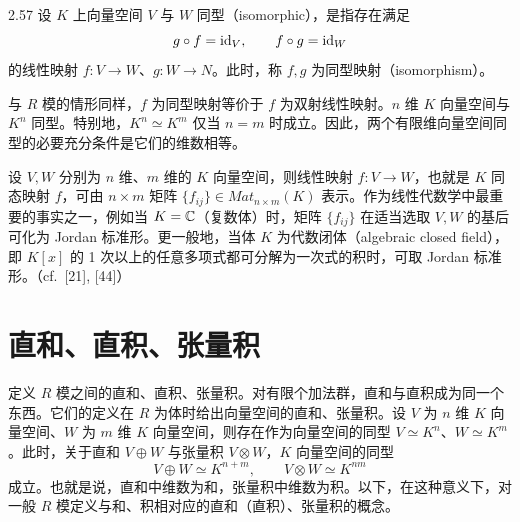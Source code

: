 \begin{definition}{2.57} 设 $K$ 上向量空间 $V$ 与 $W$ 同型（isomorphic），是指存在满足
\[
  g\circ f=\mathrm{id}_V,\qquad f\circ g=\mathrm{id}_W
\]
的线性映射 $f\colon V\to W$、$g\colon W\to N$。此时，称 $f,g$ 为同型映射（isomorphism）。\end{definition}


与 $R$ 模的情形同样，$f$ 为同型映射等价于 $f$ 为双射线性映射。$n$ 维 $K$ 向量空间与 $K^n$ 同型。特别地，$K^n\simeq K^m$ 仅当 $n=m$ 时成立。因此，两个有限维向量空间同型的必要充分条件是它们的维数相等。

设 $V,W$ 分别为 $n$ 维、$m$ 维的 $K$ 向量空间，则线性映射 $f\colon V\to W$，也就是 $K$ 同态映射 $f$，可由 $n\times m$ 矩阵 $\{f_{ij}\}\in\mathit{Mat}_{n\times m}(K)$ 表示。作为线性代数学中最重要的事实之一，例如当 $K=\mathbb{C}$（复数体）时，矩阵 $\{f_{ij}\}$ 在适当选取 $V,W$ 的基后可化为 Jordan 标准形。更一般地，当体 $K$ 为代数闭体（algebraic closed field），即 $K[x]$ 的 1 次以上的任意多项式都可分解为一次式的积时，可取 Jordan 标准形。（cf.\ [21], [44]）


\section{直和、直积、张量积}

定义 $R$ 模之间的直和、直积、张量积。对有限个加法群，直和与直积成为同一个东西。它们的定义在 $R$ 为体时给出向量空间的直和、张量积。设 $V$ 为 $n$ 维 $K$ 向量空间、$W$ 为 $m$ 维 $K$ 向量空间，则存在作为向量空间的同型 $V\simeq K^n$、$W\simeq K^m$。此时，关于直和 $V\oplus W$ 与张量积 $V\otimes W$，$K$ 向量空间的同型
\[
  V\oplus W\simeq K^{n+m},\qquad V\otimes W\simeq K^{nm}
\]
成立。也就是说，直和中维数为和，张量积中维数为积。以下，在这种意义下，对一般 $R$ 模定义与和、积相对应的直和（直积）、张量积的概念。

